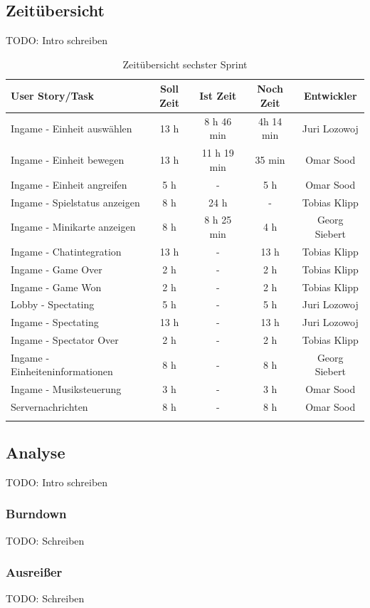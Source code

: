 \documentclass[12pt, titlepage]{scrartcl}
\begin{document}
    	\subsection{Zeit\"ubersicht}
    		TODO: Intro schreiben
    		\begin{longtable}[H]{p{6cm} c c c c }
    			\label{Time_2}
    			\textbf{User Story/Task} & \textbf{Soll Zeit} & \textbf{Ist Zeit} & \textbf{Noch Zeit} & \textbf{Entwickler} \\
    			\toprule
    			\endhead
    			Ingame - Einheit ausw\"ahlen & 13 h & 8 h 46 min & 4h 14 min & Juri Lozowoj \\
    			Ingame - Einheit bewegen & 13 h & 11 h 19 min & 35 min & Omar Sood \\
    			Ingame - Einheit angreifen & 5 h & - & 5 h & Omar Sood \\
    			Ingame - Spielstatus anzeigen & 8 h & 24 h & - & Tobias Klipp \\
    			Ingame - Minikarte anzeigen & 8 h & 8 h 25 min & 4 h & Georg Siebert \\
    			Ingame - Chatintegration & 13 h & - & 13 h & Tobias Klipp \\
    			Ingame - Game Over & 2 h & - & 2 h & Tobias Klipp \\
    			Ingame - Game Won & 2 h & - & 2 h & Tobias Klipp \\
    			Lobby - Spectating & 5 h & - & 5 h & Juri Lozowoj \\
    			Ingame - Spectating & 13 h & - & 13 h & Juri Lozowoj \\
    			Ingame - Spectator Over & 2 h & - & 2 h & Tobias Klipp \\
    			Ingame - Einheiteninformationen & 8 h & - & 8 h & Georg Siebert \\
    			Ingame - Musiksteuerung & 3 h & - & 3 h & Omar Sood \\
    			\midrule
    			Servernachrichten & 8 h & - & 8 h & Omar Sood\\
    			\caption{Zeit\"ubersicht sechster Sprint}
    		\end{longtable}
    	\subsection{Analyse}
    		TODO: Intro schreiben
	    	\subsubsection{Burndown}
	    		TODO: Schreiben
	    	\subsubsection{Ausrei{\ss}er}
	    		TODO: Schreiben
\end{document}
